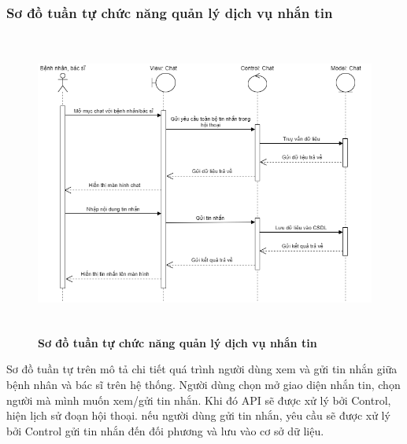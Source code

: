 \subsubsection{Sơ đồ tuần tự chức năng quản lý dịch vụ nhắn tin}
\begin{figure}[H]
  \centering
  \includegraphics[width=14cm,height=10cm]{Images/sequence/sequence_chat.png}
  \caption[Sơ đồ tuần tự chức năng quản lý dịch vụ nhắn tin]{\bfseries \fontsize{12pt}{0pt}
  \selectfont Sơ đồ tuần tự chức năng quản lý dịch vụ nhắn tin}
  \label{sequence_chat} %
\end{figure}
Sơ đồ tuần tự trên mô tả chi tiết quá trình người dùng xem và gửi tin nhắn giữa bệnh nhân và bác sĩ trên hệ thống. Người dùng chọn mở giao diện nhắn tin, 
chọn người mà mình muốn xem/gửi tin nhắn. Khi đó API sẽ được xử lý bởi Control, hiện lịch sử đoạn hội thoại. nếu người dùng gửi tin nhắn, yêu cầu sẽ được 
xử lý bởi Control gửi tin nhắn đến đối phương và lưu vào cơ sở dữ liệu.

